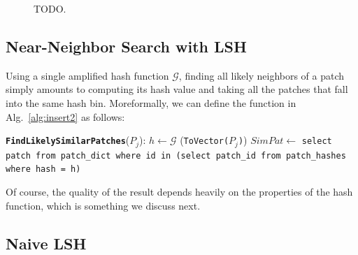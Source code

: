 \begin{figure}[ht!]
\centering
{}
\quad
{}
\caption{TODO.}
\label{fig:proj}
\end{figure}

\subsection{Near-Neighbor Search with LSH}\label{ssec:nn-lsh}

Using a single amplified hash function $\mathcal{G}$, finding
all likely neighbors of a patch simply amounts to computing
its hash value and taking all the patches that fall into the
same hash bin.
Moreformally, we can define the function
in Alg.~\ref{alg:insert2} as follows:
\begin{algorithmic}[1]
\Statex \texttt{\textbf{FindLikelySimilarPatches}}($P_j$):
\State $h \leftarrow \mathcal{G}$ (\texttt{ToVector($P_j$)})
\State $SimPat \leftarrow$ \texttt{select patch from patch\_dict where id in
(select patch\_id from patch\_hashes where hash = h)}
\end{algorithmic}
Of course, the quality of the result depends heavily on the
properties of the hash function, which is something we discuss next.

\subsection{Naive LSH}\label{sec:naive-nn}

